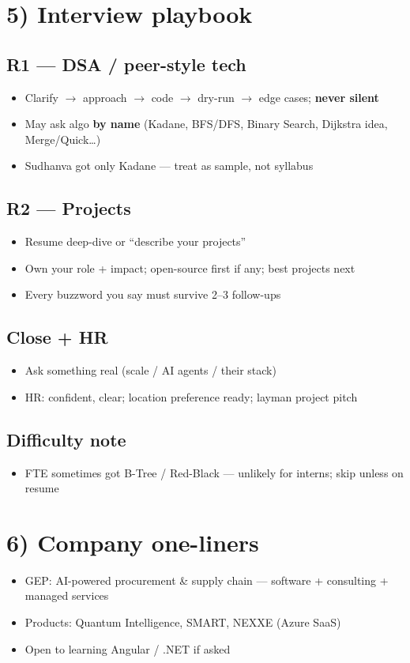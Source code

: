 \documentclass[a4paper,9pt]{extarticle}
\begin{document}
\section{5) Interview playbook}
\subsection{R1 --- DSA / peer-style tech}
\begin{itemize}
  \item Clarify $\to$ approach $\to$ code $\to$ dry-run $\to$ edge cases; \textbf{never silent}
  \item May ask algo \textbf{by name} (Kadane, BFS/DFS, Binary Search, Dijkstra idea, Merge/Quick\ldots)
  \item Sudhanva got only Kadane --- treat as sample, not syllabus
\end{itemize}
\subsection{R2 --- Projects}
\begin{itemize}
  \item Resume deep-dive or ``describe your projects''
  \item Own your role + impact; open-source first if any; best projects next
  \item Every buzzword you say must survive 2--3 follow-ups
\end{itemize}
\subsection{Close + HR}
\begin{itemize}
  \item Ask something real (scale / AI agents / their stack)
  \item HR: confident, clear; location preference ready; layman project pitch
\end{itemize}
\subsection{Difficulty note}
\begin{itemize}
  \item FTE sometimes got B-Tree / Red-Black --- unlikely for interns; skip unless on resume
\end{itemize}

\section{6) Company one-liners}
\begin{itemize}
  \item GEP: AI-powered procurement \& supply chain --- software + consulting + managed services
  \item Products: Quantum Intelligence, SMART, NEXXE (Azure SaaS)
  \item Open to learning Angular / .NET if asked
\end{itemize}
\end{document}
